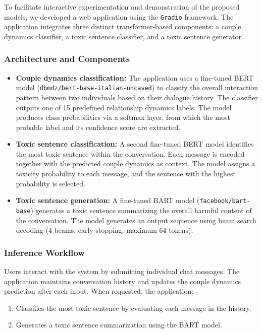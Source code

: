 \documentclass[conference]{IEEEtran}
\begin{document}
To facilitate interactive experimentation and demonstration of the proposed models, we developed a web application using the \texttt{Gradio} framework. The application integrates three distinct transformer-based components: a couple dynamics classifier, a toxic sentence classifier, and a toxic sentence generator. 

\subsubsection{Architecture and Components}
\begin{itemize}
    \item \textbf{Couple dynamics classification:} The application uses a fine-tuned BERT model (\texttt{dbmdz/bert-base-italian-uncased}) to classify the overall interaction pattern between two individuals based on their dialogue history. The classifier outputs one of 15 predefined relationship dynamics labels. The model produces class probabilities via a softmax layer, from which the most probable label and its confidence score are extracted.
    
    \item \textbf{Toxic sentence classification:} A second fine-tuned BERT model identifies the most toxic sentence within the conversation. Each message is encoded together with the predicted couple dynamics as context. The model assigns a toxicity probability to each message, and the sentence with the highest probability is selected.
    
    \item \textbf{Toxic sentence generation:} A fine-tuned BART model (\texttt{facebook/bart-base}) generates a toxic sentence summarizing the overall harmful content of the conversation. The model generates an output sequence using beam search decoding (4 beams, early stopping, maximum 64 tokens).
\end{itemize}

\subsubsection{Inference Workflow}
Users interact with the system by submitting individual chat messages. The application maintains conversation history and updates the couple dynamics prediction after each input. When requested, the application:
\begin{enumerate}
    \item Classifies the most toxic sentence by evaluating each message in the history.
    \item Generates a toxic sentence summarization using the BART model.
\end{enumerate}
\end{document}
